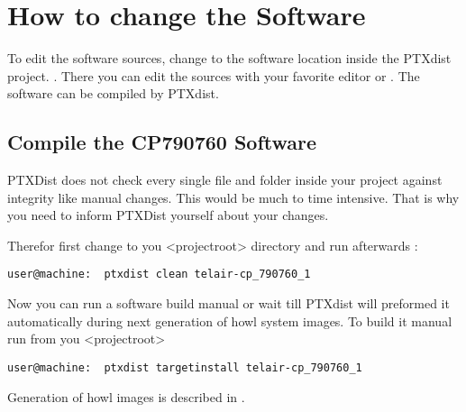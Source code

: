 \section{How to change the Software}%
\label{sec:software_change}
To edit the software sources, change to the software location inside the PTXdist
project. \footnotemark[1]. There you can edit the
sources with your favorite editor or . The software can be
compiled by PTXdist.

\subsection{Compile the CP790760 Software}%
\label{sub:compile_CP790760}

PTXDist does not check every single file and folder inside your project against
integrity like manual changes. This would be much to time intensive. That is
why you need to inform PTXDist yourself about your changes.

Therefor first change to you <projectroot> directory and run afterwards
\footnotemark[1]:



\bigbreak%
\begin{lstlisting}[caption=Mark the CP790760 software as changed]
user@machine:  ptxdist clean telair-cp_790760_1
\end{lstlisting}

Now you can run a software build manual or wait till PTXdist will preformed it
automatically during next generation of howl system images. To build it manual
run from you <projectroot>

\bigbreak%
\begin{lstlisting}[caption=Build the Telair CP790760 software manual]
user@machine:  ptxdist targetinstall telair-cp_790760_1
\end{lstlisting}


Generation of howl images is described in .


